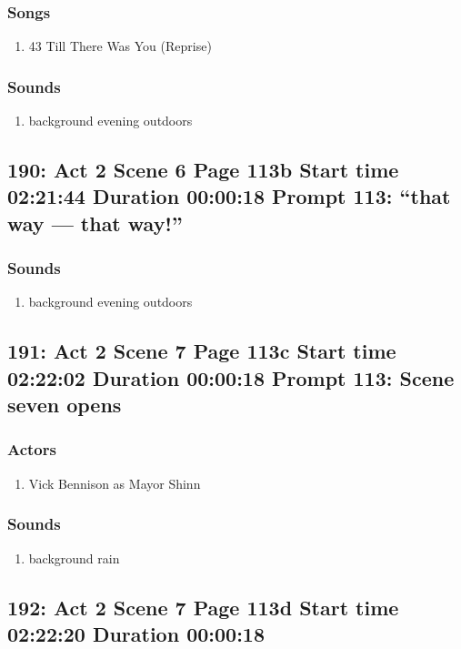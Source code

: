 \subsubsection{Songs}
\begin{enumerate}
\item 43 Till There Was You (Reprise)
\end{enumerate}\subsubsection{Sounds}
\begin{enumerate}
\item background evening outdoors
\end{enumerate}
\subsection{190: Act 2 Scene 6 Page 113b Start time 02:21:44 Duration 00:00:18 Prompt 113: ``that way --- that way!''}
\subsubsection{Sounds}
\begin{enumerate}
\item background evening outdoors
\end{enumerate}
\subsection{191: Act 2 Scene 7 Page 113c Start time 02:22:02 Duration 00:00:18 Prompt 113: Scene seven opens}

\subsubsection{Actors}
\begin{enumerate}
\item Vick Bennison as Mayor Shinn
\end{enumerate}

\subsubsection{Sounds}
\begin{enumerate}
\item background rain
\end{enumerate}
\subsection{192: Act 2 Scene 7 Page 113d Start time 02:22:20 Duration 00:00:18}

